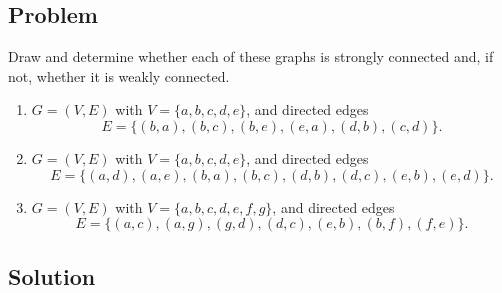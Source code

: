 \documentclass[12pt]{article}
\begin{document}
\subsection{Problem}
Draw and determine whether each of these graphs is strongly connected and, if not, whether it is weakly connected.

\begin{enumerate}[label=(\alph*)]
\item \(G=(V,E)\) with \(V=\{a,b,c,d,e\}\), and directed edges
\[
E=\{(b,a),(b,c),(b,e),(e,a),(d,b),(c,d)\}.
\]

\item \(G=(V,E)\) with \(V=\{a,b,c,d,e\}\), and directed edges
\[
E=\{(a,d),(a,e),(b,a),(b,c),(d,b),(d,c),(e,b),(e,d)\}.
\]

\item \(G=(V,E)\) with \(V=\{a,b,c,d,e,f,g\}\), and directed edges
\[
E=\{(a,c),(a,g),(g,d),(d,c),(e,b),(b,f),(f,e)\}.
\]
\end{enumerate}

\subsection{Solution}
\end{document}
